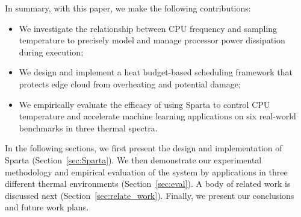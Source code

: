 In summary, with this paper, we make the following contributions:

\begin{itemize}
    \item We investigate the relationship between CPU frequency and sampling temperature to precisely model and manage processor power dissipation during execution;
    \vspace{1mm}
    \item We design and implement a heat budget-based scheduling framework that protects edge cloud from overheating and potential damage;
    \vspace{1mm}
    \item We empirically evaluate the efficacy of using Sparta to control CPU temperature and accelerate machine learning applications on six real-world benchmarks in three thermal spectra. 
\end{itemize}

In the following sections, we first present the design and implementation of Sparta (Section~\ref{sec:Sparta}). We then demonstrate our experimental methodology and empirical evaluation of the system by applications in three different thermal environments (Section~\ref{sec:eval}). A body of related work is discussed next (Section~\ref{sec:relate_work}). Finally, we present our conclusions and future work plans.